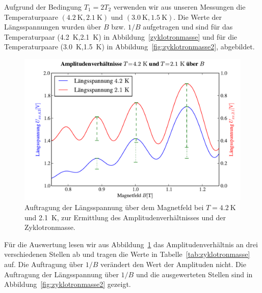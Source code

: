\documentclass[paper=a4,fontsize=10pt,DIV=18,twocolumn,parskip=half]{scrartcl}
\numberwithin{equation}{section}    %
\newcommand{\kor}[1]{{\color{darkgreen}#1}}
\begin{document}
Aufgrund der Bedingung $T_{1}=2T_{2}$ verwenden wir aus unseren Messungen die Temperaturpaare $(\SI{4.2}{\kelvin},\SI{2.1}{\kelvin})$ und $(\SI{3.0}{\kelvin},\SI{1.5}{\kelvin})$. \kor{Die Werte der Längsspannungen wurden über $B$ bzw. $1/B$ aufgetragen und sind für das Temperaturpaar (\SI{4.2}{\kelvin},\SI{2.1}{\kelvin}) in Abbildung~\ref{zyklotronmasse} und für die Temperaturpaare (\SI{3.0}{\kelvin},\SI{1.5}{\kelvin}) in Abbildung~\ref{fig:zyklotronmasse2}, abgebildet.}
\begin{figure}[htp]
	\begin{center}
		\includegraphics[width=\columnwidth]{Data-Plots/11-4,2-2,1-zyklotron-B.pdf}
		\caption{Auftragung der Längsspannung über dem Magnetfeld bei $T=\SI{4.2}{\kelvin}$ und \SI{2.1}{\kelvin}, zur Ermittlung des Amplitudenverhältnisses und der Zyklotronmasse.}
		\label{fig:zyklotronmasse}
	\end{center}
\end{figure}
Für die Auswertung lesen wir aus Abbildung~\ref{fig:zyklotronmasse} das Amplitudenverhältnis an drei verschiedenen Stellen ab und tragen die Werte in Tabelle~\ref{tab:zyklotronmasse} auf. Die Auftragung über $1/B$ verändert den Wert der Amplituden nicht. Die Auftragung der Längsspannung über $1/B$ und die ausgewerteten Stellen sind in Abbildung~\ref{fig:zyklotronmasse2} gezeigt.
\end{document}
